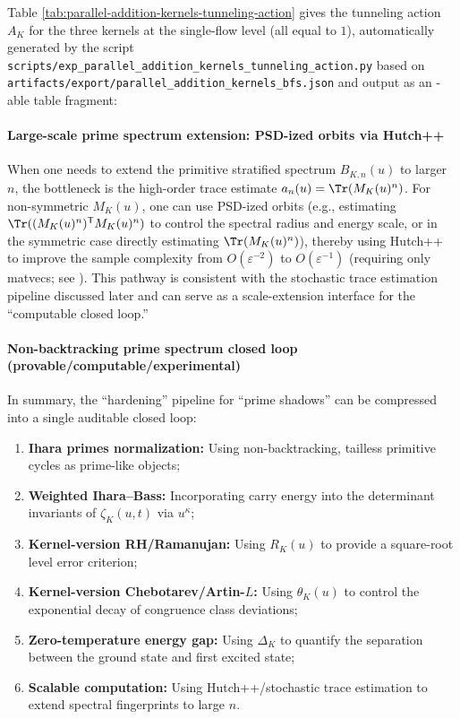 \begin{remark}\label{rem:ihara-AK-table}
Table \ref{tab:parallel-addition-kernels-tunneling-action} gives the tunneling action \(A_K\) for the three kernels at the single-flow level (all equal to \(1\)), automatically generated by the script
\texttt{scripts/exp\_parallel\_addition\_kernels\_tunneling\_action.py}
based on \texttt{artifacts/export/parallel\_addition\_kernels\_bfs.json} and output as an \verb||-able table fragment:

\end{remark}

\paragraph{Large-scale prime spectrum extension: PSD-ized orbits via Hutch++}
When one needs to extend the primitive stratified spectrum $B_{K,n}(u)$ to larger $n$, the bottleneck is the high-order trace estimate $a_n(u)=\Tr(M_K(u)^n)$. For non-symmetric $M_K(u)$, one can use PSD-ized orbits (e.g., estimating $\Tr((M_K(u)^n)^{\mathsf T}M_K(u)^n)$ to control the spectral radius and energy scale, or in the symmetric case directly estimating $\Tr(M_K(u)^n)$), thereby using Hutch++ to improve the sample complexity from $O(\varepsilon^{-2})$ to $O(\varepsilon^{-1})$ (requiring only matvecs; see \cite{MeyerMuscoMuscoWoodruff2021Hutchpp}). This pathway is consistent with the stochastic trace estimation pipeline discussed later and can serve as a scale-extension interface for the ``computable closed loop.''

\paragraph{Non-backtracking prime spectrum closed loop (provable/computable/experimental)}
In summary, the ``hardening'' pipeline for ``prime shadows'' can be compressed into a single auditable closed loop:
\begin{enumerate}
  \item \textbf{Ihara primes normalization:} Using non-backtracking, tailless primitive cycles as prime-like objects;
  \item \textbf{Weighted Ihara--Bass:} Incorporating carry energy into the determinant invariants of $\zeta_K(u,t)$ via $u^{\kappa}$;
  \item \textbf{Kernel-version RH/Ramanujan:} Using $R_K(u)$ to provide a square-root level error criterion;
  \item \textbf{Kernel-version Chebotarev/Artin-$L$:} Using $\theta_K(u)$ to control the exponential decay of congruence class deviations;
  \item \textbf{Zero-temperature energy gap:} Using $\Delta_K$ to quantify the separation between the ground state and first excited state;
  \item \textbf{Scalable computation:} Using Hutch++/stochastic trace estimation to extend spectral fingerprints to large $n$.
\end{enumerate}

